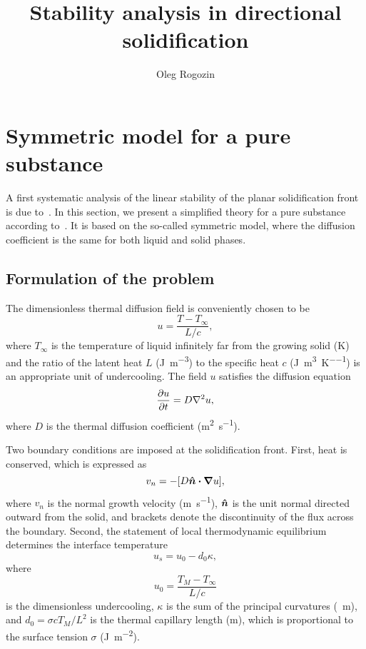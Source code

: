 \documentclass{article}
\title{Stability analysis in directional solidification}
\author{Oleg Rogozin}
\newcommand{\bn}{\vu*{n}}
\begin{document}
\maketitle
\tableofcontents

\section{Symmetric model for a pure substance}

A first systematic analysis of the linear stability of the planar solidification front is due to~\textcite{mullins1964stability}.
In this section, we present a simplified theory for a pure substance according to~\textcite{langer1987lectures}.
It is based on the so-called symmetric model, where the diffusion coefficient is the same for both liquid and solid phases.

\subsection{Formulation of the problem}

The dimensionless thermal diffusion field is conveniently chosen to be
\begin{equation}\label{eq:u}
    u = \frac{T-T_\infty}{L/c},
\end{equation}
where $T_\infty$ is the temperature of liquid infinitely far from the growing solid (\si{\K})
and the ratio of the latent heat $L$ (\si{\J\per\m\cubed}) to the specific heat $c$ (\si{\J\per\m\cubed\per\K})
is an appropriate unit of undercooling.
The field $u$ satisfies the diffusion equation
\begin{equation}\label{eq:diffusion}
    \pdv{u}{t} = D\nabla^2u,
\end{equation}
where $D$ is the thermal diffusion coefficient (\si{\m\squared\per\s}).

Two boundary conditions are imposed at the solidification front.
First, heat is conserved, which is expressed as
\begin{equation}\label{eq:bc1}
    v_n = -[D\bn\vdot\grad{u}],
\end{equation}
where $v_n$ is the normal growth velocity (\si{\m\per\s}),
$\bn$ is the unit normal directed outward from the solid,
and brackets denote the discontinuity of the flux across the boundary.
Second, the statement of local thermodynamic equilibrium determines the interface temperature
\begin{equation}\label{eq:bc2}
    u_s = u_0 - d_0\kappa,
\end{equation}
where
\begin{equation}\label{eq:undercooling}
    u_0 = \frac{T_M - T_\infty}{L/c}
\end{equation}
is the dimensionless undercooling,
$\kappa$ is the sum of the principal curvatures (\si{\per\m}), and
$d_0 = \sigma c T_M/L^2$ is the thermal capillary length (\si{\m}),
which is proportional to the surface tension $\sigma$ (\si{\J\per\m\squared}).
\end{document}
